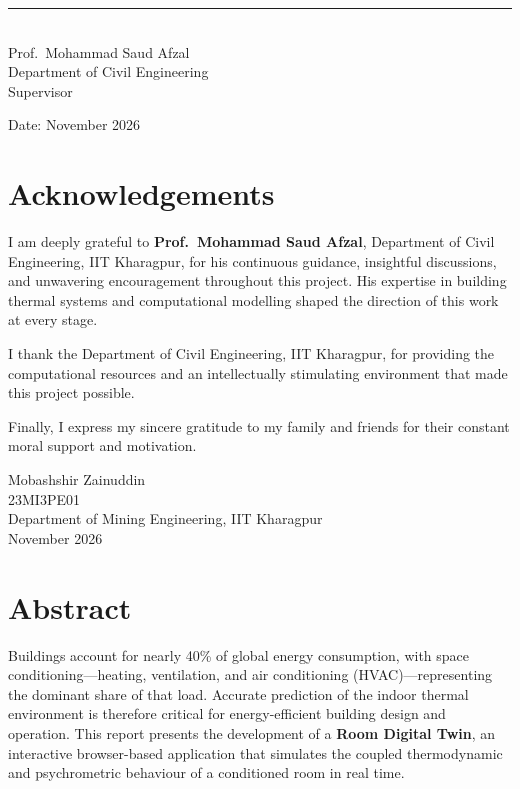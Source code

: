 \documentclass[12pt,a4paper]{report}
\begin{document}
\vspace{4cm}

\noindent\rule{6cm}{0.4pt}\\
Prof.\ Mohammad Saud Afzal\\
Department of Civil Engineering\\
Supervisor

\vspace{1cm}
\noindent Date: November 2026

\newpage

\thispagestyle{plain}
\chapter*{Acknowledgements}

I am deeply grateful to \textbf{Prof.\ Mohammad Saud Afzal}, Department of Civil Engineering, IIT Kharagpur, for his continuous guidance, insightful discussions, and unwavering encouragement throughout this project. His expertise in building thermal systems and computational modelling shaped the direction of this work at every stage.

I thank the Department of Civil Engineering, IIT Kharagpur, for providing the computational resources and an intellectually stimulating environment that made this project possible.

Finally, I express my sincere gratitude to my family and friends for their constant moral support and motivation.

\vspace{2cm}
\hfill Mobashshir Zainuddin\\
\hfill 23MI3PE01\\
\hfill Department of Mining Engineering, IIT Kharagpur\\
\hfill November 2026

\newpage

\chapter*{Abstract}

Buildings account for nearly 40\% of global energy consumption, with space conditioning---heating, ventilation, and air conditioning (HVAC)---representing the dominant share of that load. Accurate prediction of the indoor thermal environment is therefore critical for energy-efficient building design and operation. This report presents the development of a \textbf{Room Digital Twin}, an interactive browser-based application that simulates the coupled thermodynamic and psychrometric behaviour of a conditioned room in real time.
\end{document}
